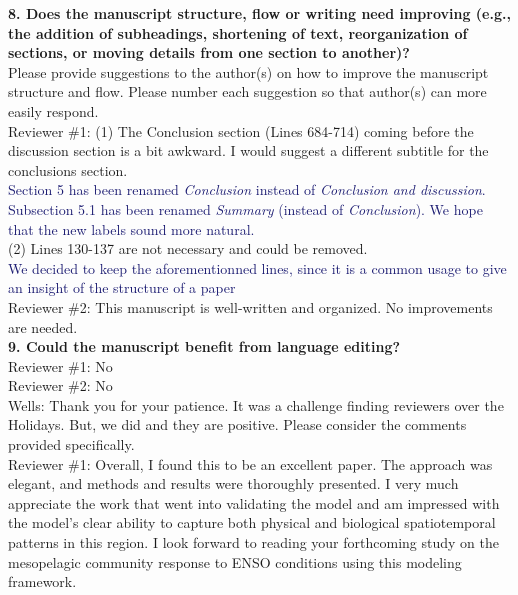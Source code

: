 \documentclass[12pt]{article}
\newcommand{\resp}[1]{\textcolor{MidnightBlue}{#1}}
\begin{document}
\textbf{8. Does the manuscript structure, flow or writing need improving (e.g., the addition of subheadings, shortening of text, reorganization of sections, or moving details from one section to another)?}\\

Please provide suggestions to the author(s) on how to improve the manuscript structure and flow. Please number each suggestion so that author(s) can more easily respond.\\

Reviewer \#1: (1) The Conclusion section (Lines 684-714) coming before the discussion section is a bit awkward. I would suggest a different subtitle for the conclusions section.\\

\resp{Section 5 has been renamed \emph{Conclusion} instead of \emph{Conclusion and discussion}. Subsection 5.1 has been renamed \emph{Summary} (instead of \emph{Conclusion}). We hope that the new labels sound more natural.} \\

(2) Lines 130-137 are not necessary and could be removed.\\

\resp{We decided to keep the aforementionned lines, since it is a common usage to give an insight of the structure of a paper} \\

Reviewer \#2: This manuscript is well-written and organized. No improvements are needed.\\

\textbf{9. Could the manuscript benefit from language editing?}\\

Reviewer \#1: No\\

Reviewer \#2: No\\

Wells: Thank you for your patience. It was a challenge finding reviewers over the Holidays. But, we did and they are positive. Please consider the comments provided specifically.\\

Reviewer \#1: Overall, I found this to be an excellent paper. The approach was elegant, and methods and results were thoroughly presented. I very much appreciate the work that went into validating the model and am impressed with the model's clear ability to capture both physical and biological spatiotemporal patterns in this region. I look forward to reading your forthcoming study on the mesopelagic community response to ENSO conditions using this modeling framework.\\
\end{document}
